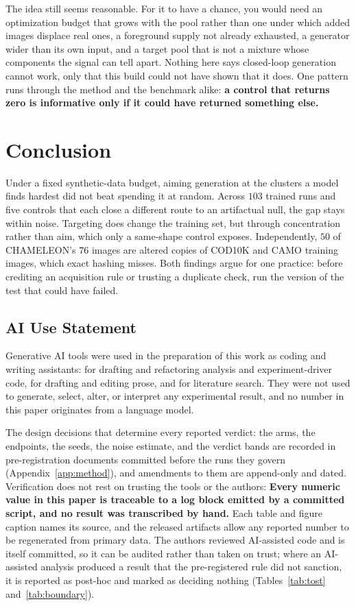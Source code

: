 \documentclass{article}
\begin{document}
The idea still seems reasonable. For it to have a chance, you would need an optimization budget that
grows with the pool rather than one under which added images displace real ones, a foreground supply
not already exhausted, a generator wider than its own input, and a target pool that is not a mixture
whose components the signal can tell apart. Nothing here says closed-loop generation cannot work,
only that this build could not have shown that it does. One pattern runs through the method and the
benchmark alike: \textbf{a control that returns zero is informative only if it could have returned
something else.}

\section{Conclusion}
\label{sec:conclusion}
Under a fixed synthetic-data budget, aiming generation at the clusters a model finds hardest did not beat spending it at random. Across $103$ trained runs and five controls that each close a different
route to an artifactual null, the gap stays within noise. Targeting does change the training set,
but through concentration rather than aim, which only a same-shape control exposes. Independently,
$50$ of CHAMELEON's $76$ images are altered copies of COD10K and CAMO training images, which exact
hashing misses. Both findings argue for one practice: before crediting an acquisition rule or
trusting a duplicate check, run the version of the test that could have failed.

\subsection*{AI Use Statement}

Generative AI tools were used in the preparation of this work as coding and writing assistants:
for drafting and refactoring analysis and experiment-driver code, for drafting and editing prose,
and for literature search. They were not used to generate, select, alter, or interpret any
experimental result, and no number in this paper originates from a language model.

The design decisions that determine every reported verdict: the arms, the endpoints, the seeds, the noise estimate, and the verdict bands are recorded in pre-registration documents
committed before the runs they govern (Appendix~\ref{app:method}), and amendments to them are
append-only and dated. Verification does not rest on trusting the tools or the authors:
\textbf{Every numeric value in this paper is traceable to a log block emitted by a committed script, and no result was transcribed by hand.} Each table and figure caption names its source, and the released artifacts allow any reported number to be regenerated from primary data. The authors reviewed AI-assisted code and is itself committed, so it can be audited rather than taken on
trust; where an AI-assisted analysis produced a result that the pre-registered rule did not
sanction, it is reported as post-hoc and marked as deciding nothing
(Tables~\ref{tab:tost} and~\ref{tab:boundary}).
\end{document}
